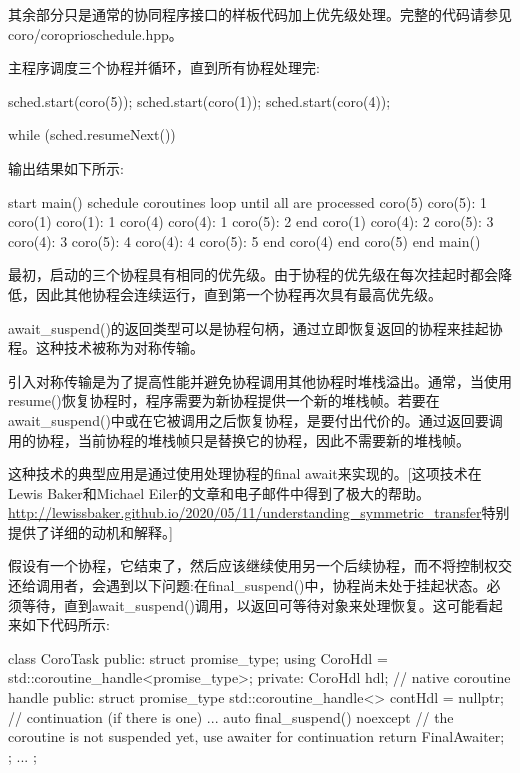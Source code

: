 其余部分只是通常的协同程序接口的样板代码加上优先级处理。完整的代码请参见coro/coroprioschedule.hpp。

主程序调度三个协程并循环，直到所有协程处理完:

\begin{cpp}
sched.start(coro(5));
sched.start(coro(1));
sched.start(coro(4));

while (sched.resumeNext()) {
}
\end{cpp}

输出结果如下所示:

\begin{shell}
start main()
schedule coroutines
loop until all are processed
	coro(5)
	coro(5): 1
	coro(1)
	coro(1): 1
	coro(4)
	coro(4): 1
	coro(5): 2
	end coro(1)
	coro(4): 2
	coro(5): 3
	coro(4): 3
	coro(5): 4
	coro(4): 4
	coro(5): 5
	end coro(4)
	end coro(5)
end main()
\end{shell}

最初，启动的三个协程具有相同的优先级。由于协程的优先级在每次挂起时都会降低，因此其他协程会连续运行，直到第一个协程再次具有最高优先级。


await\_suspend()的返回类型可以是协程句柄，通过立即恢复返回的协程来挂起协程。这种技术被称为对称传输。

引入对称传输是为了提高性能并避免协程调用其他协程时堆栈溢出。通常，当使用resume()恢复协程时，程序需要为新协程提供一个新的堆栈帧。若要在await\_suspend()中或在它被调用之后恢复协程，是要付出代价的。通过返回要调用的协程，当前协程的堆栈帧只是替换它的协程，因此不需要新的堆栈帧。


这种技术的典型应用是通过使用处理协程的final await来实现的。[这项技术在Lewis Baker和Michael Eiler的文章和电子邮件中得到了极大的帮助。\url{http://lewissbaker.github.io/2020/05/11/understanding_symmetric_transfer}特别提供了详细的动机和解释。]

假设有一个协程，它结束了，然后应该继续使用另一个后续协程，而不将控制权交还给调用者，会遇到以下问题:在final\_suspend()中，协程尚未处于挂起状态。必须等待，直到await\_suspend()调用，以返回可等待对象来处理恢复。这可能看起来如下代码所示:

\begin{cpp}
class CoroTask
{
public:
	struct promise_type;
	using CoroHdl = std::coroutine_handle<promise_type>;
private:
	CoroHdl hdl; // native coroutine handle
public:
	struct promise_type {
		std::coroutine_handle<> contHdl = nullptr; // continuation (if there is one)
		...
		auto final_suspend() noexcept {
			// the coroutine is not suspended yet, use awaiter for continuation
			return FinalAwaiter{};
		}
	};
	...
};
\end{cpp}

